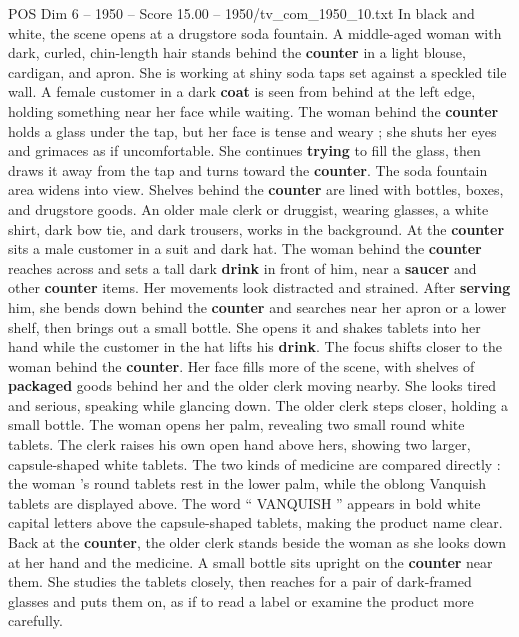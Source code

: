 \begin{textsample}{POS Dim 6 – 1950 – Score 15.00 – 1950/tv\_com\_1950\_10.txt}  \label{ex:f6_pos_007}
In black and white, the scene opens at a drugstore soda fountain.
A middle-aged woman with dark, curled, chin-length hair stands behind the \textbf{counter} in a light blouse, cardigan, and apron.
She is working at shiny soda taps set against a speckled tile wall.
A female customer in a dark \textbf{coat} is seen from behind at the left edge, holding something near her face while waiting.
The woman behind the \textbf{counter} holds a glass under the tap, but her face is tense and weary ; she shuts her eyes and grimaces as if uncomfortable.
She continues \textbf{trying} to fill the glass, then draws it away from the tap and turns toward the \textbf{counter}.
The soda fountain area widens into view.
Shelves behind the \textbf{counter} are lined with bottles, boxes, and drugstore goods.
An older male clerk or druggist, wearing glasses, a white shirt, dark bow tie, and dark trousers, works in the background.
At the \textbf{counter} sits a male customer in a suit and dark hat.
The woman behind the \textbf{counter} reaches across and sets a tall dark \textbf{drink} in front of him, near a \textbf{saucer} and other \textbf{counter} items.
Her movements look distracted and strained.
After \textbf{serving} him, she bends down behind the \textbf{counter} and searches near her apron or a lower shelf, then brings out a small bottle.
She opens it and shakes tablets into her hand while the customer in the hat lifts his \textbf{drink}.
The focus shifts closer to the woman behind the \textbf{counter}.
Her face fills more of the scene, with shelves of \textbf{packaged} goods behind her and the older clerk moving nearby.
She looks tired and serious, speaking while glancing down.
The older clerk steps closer, holding a small bottle.
The woman opens her palm, revealing two small round white tablets.
The clerk raises his own open hand above hers, showing two larger, capsule-shaped white tablets.
The two kinds of medicine are compared directly : the woman ’s round tablets rest in the lower palm, while the oblong Vanquish tablets are displayed above.
The word “ VANQUISH ” appears in bold white capital letters above the capsule-shaped tablets, making the product name clear.
Back at the \textbf{counter}, the older clerk stands beside the woman as she looks down at her hand and the medicine.
A small bottle sits upright on the \textbf{counter} near them.
She studies the tablets closely, then reaches for a pair of dark-framed glasses and puts them on, as if to read a label or examine the product more carefully.

\end{textsample}
